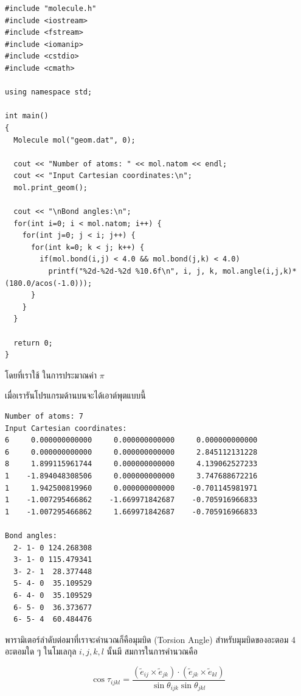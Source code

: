 \begin{lstlisting}[style=MyC++]
#include "molecule.h"
#include <iostream>
#include <fstream>
#include <iomanip>
#include <cstdio>
#include <cmath>

using namespace std;
  
int main()
{
  Molecule mol("geom.dat", 0);
  
  cout << "Number of atoms: " << mol.natom << endl;
  cout << "Input Cartesian coordinates:\n";
  mol.print_geom();

  cout << "\nBond angles:\n";
  for(int i=0; i < mol.natom; i++) {
    for(int j=0; j < i; j++) {
      for(int k=0; k < j; k++) {
        if(mol.bond(i,j) < 4.0 && mol.bond(j,k) < 4.0)
          printf("%2d-%2d-%2d %10.6f\n", i, j, k, mol.angle(i,j,k)*(180.0/acos(-1.0)));
      }
    }
  }

  return 0;
}
\end{lstlisting}

\vspace{5pt}

\noindent โดยที่เราใช้  ในการประมาณค่า $\pi$

เมื่อเรารันโปรแกรมด้านบนจะได้เอาต์พุตแบบนี้

\vspace{5pt}

\begin{lstlisting}
Number of atoms: 7
Input Cartesian coordinates:
6     0.000000000000     0.000000000000     0.000000000000
6     0.000000000000     0.000000000000     2.845112131228
8     1.899115961744     0.000000000000     4.139062527233
1    -1.894048308506     0.000000000000     3.747688672216
1     1.942500819960     0.000000000000    -0.701145981971
1    -1.007295466862    -1.669971842687    -0.705916966833
1    -1.007295466862     1.669971842687    -0.705916966833

Bond angles:
  2- 1- 0 124.268308
  3- 1- 0 115.479341
  3- 2- 1  28.377448
  5- 4- 0  35.109529
  6- 4- 0  35.109529
  6- 5- 0  36.373677
  6- 5- 4  60.484476
\end{lstlisting}

\vspace{5pt}

\noindent {}

พารามิเตอร์ลำดับต่อมาที่เราจะคำนวณก็คือมุมบิด (Torsion Angle) สำหรับมุมบิดของอะตอม 4 อะตอมใด ๆ ในโมเลกุล $i, j, k, l$ นั้นมี%
สมการในการคำนวณคือ

\begin{equation}
  \cos \tau_{ijkl}
  =
  \frac{
    (\tilde{e}_{ij} \times \tilde{e}_{jk})
    \cdot
    (\tilde{e}_{jk} \times \tilde{e}_{kl})
  }
  {
    \sin \theta_{ijk}
    \sin \theta_{jkl}
  }
\end{equation}

